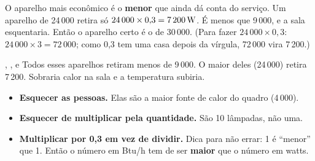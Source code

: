 O aparelho mais econômico é o \textbf{menor} que ainda dá conta do serviço. Um aparelho de 24\,000 retira só
$24\,000 \times 0{,}3 = 7\,200\,\text{W}$. É menos que 9\,000, e a sala esquentaria. Então o aparelho certo é o de 30\,000.
(Para fazer $24\,000 \times 0{,}3$: $24\,000 \times 3 = 72\,000$; como 0,3 tem uma casa depois da vírgula, 72\,000 vira 7\,200.)


\begin{outras}
, ,  e  Todos esses aparelhos retiram menos de 9\,000. O maior deles (24\,000) retira
7\,200. Sobraria calor na sala e a temperatura subiria.
\end{outras}

\begin{pegadinha}
\begin{itemize}
  \item \textbf{Esquecer as pessoas.} Elas são a maior fonte de calor do quadro (4\,000).
  \item \textbf{Esquecer de multiplicar pela quantidade.} São 10 lâmpadas, não uma.
  \item \textbf{Multiplicar por 0,3 em vez de dividir.} Dica para não errar: 1 é ``menor'' que 1. Então o número em
        Btu/h tem de ser \textbf{maior} que o número em watts.
\end{itemize}
\end{pegadinha}

